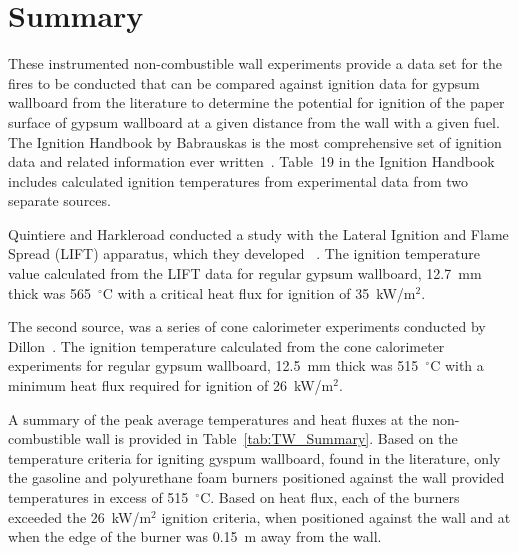\documentclass[twoside]{uocthesis}
\begin{document}
{\section{Summary}

These instrumented non-combustible wall experiments provide a data set for the fires to be conducted that can be compared against ignition data for gypsum wallboard from the literature to determine the potential for ignition of the paper surface of gypsum wallboard at a given distance from the wall with a given fuel. The Ignition Handbook by Babrauskas is the most comprehensive set of ignition data and related information ever written~\cite{Babrauskas:2003}.  Table~19 in the Ignition Handbook includes calculated ignition temperatures from experimental data from two separate sources.

Quintiere and Harkleroad conducted a study with the Lateral Ignition and Flame Spread (LIFT) apparatus, which they developed ~\cite{ASTM_E1321,Quintiere:1985}.
The ignition temperature value calculated from the LIFT data for regular gypsum wallboard, 12.7~mm thick was 565~$^{\circ}$C with a critical heat flux for ignition of 35~kW/m$^2$.

The second source, was a series of cone calorimeter experiments conducted by Dillon~\cite{ASTM_E1354,Dillon:1998}. The ignition temperature calculated from the cone calorimeter experiments for regular gypsum wallboard, 12.5~mm thick was 515~$^{\circ}$C with a minimum heat flux required for ignition of 26~kW/m$^2$.

A summary of the peak average temperatures and heat fluxes at the non-combustible wall is provided in Table~\ref{tab:TW_Summary}.   Based on the temperature criteria for igniting gyspum wallboard, found in the literature, only the gasoline and polyurethane foam burners positioned against the wall provided temperatures in excess of 515~$^{\circ}$C.  Based on heat flux, each of the burners exceeded the 26~kW/m$^2$ ignition criteria, when positioned against the wall and at when the edge of the burner was 0.15~m away from the wall.  

}
\end{document}
